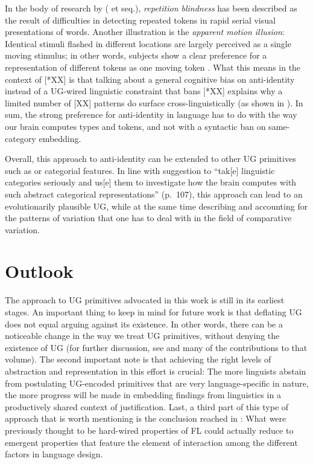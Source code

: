\documentclass[output=paper]{langsci/langscibook}
\begin{document}
In the body of research by \citeauthor{Kanwisher1987} (\citeyear{Kanwisher1987}
et seq.), \emph{repetition blindness} has been described as the
result of difficulties in detecting repeated tokens in rapid serial visual
presentations of words.  Another illustration is the \emph{apparent motion
illusion}: Identical stimuli flashed in different locations are largely
perceived as a single moving stimulus; in other words, subjects show a clear
preference for a representation of different tokens as one moving token
\citep{VetterEtAl2012}. What this means in the context of [*XX] is that talking
about a general cognitive bias on anti-identity instead of a UG-wired
linguistic constraint that bans [*XX] explains why a limited number of [XX]
patterns do surface cross-linguistically (as shown in \citealt{Leivada2015b}).
In sum, the strong preference for anti-identity in language has to do with the
way our brain computes types and tokens, and not with a syntactic ban on
same-category embedding.

Overall, this approach to anti-identity can be extended to other \gls{UG}
primitives such as  or categorial features. In line with
 suggestion to \enquote{tak[e] linguistic categories
    seriously and us[e] them to investigate how the brain computes with such
abstract categorical representations} (p.\ 107), this approach can lead to an
evolutionarily plausible \gls{UG}, while at the same time describing and
accounting for the patterns of variation that one has to deal with in the field
of comparative variation.

\section{Outlook}\label{sec:25:4}

The approach to \gls{UG} primitives advocated in this work is still in its
earliest stages. An important thing to keep in mind for future work is that
deflating \gls{UG} does not equal arguing against its existence. In other
words, there can be a noticeable change in the way we treat \gls{UG}
primitives, without denying the existence of \gls{UG} (for further discussion,
see \citealt{Roberts2016b} and many of the contributions to that volume). The
second important note is that achieving the right levels of abstraction and
representation in this effort is crucial: The more linguists abstain from
postulating UG-encoded primitives that are very language-specific in nature,
the more progress will be made in embedding findings from linguistics in a
productively shared context of justification. Last, a third part of this type
of approach that is worth mentioning is the conclusion reached in
\citet{BibRobShee2014}: What were previously thought to be hard-wired
properties of \gls{FL} could actually reduce to emergent properties that
feature the element of interaction among the different factors in language
design.
\end{document}
